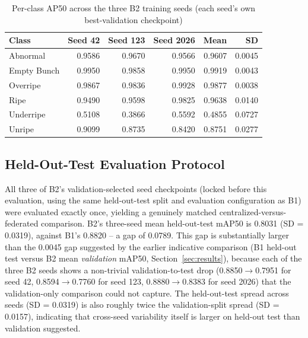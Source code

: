 \documentclass[11pt]{article}
\begin{document}
\begin{table}[H]
  \centering
  \caption{Per-class AP50 across the three B2 training seeds (each seed's own best-validation checkpoint)}
  \label{tab:per-class-stability}
  \begin{tabular}{lrrrrr}
    \toprule
    Class & Seed 42 & Seed 123 & Seed 2026 & Mean & SD \\
    \midrule
    Abnormal    & 0.9586 & 0.9670 & 0.9566 & 0.9607 & 0.0045 \\
    Empty Bunch & 0.9950 & 0.9858 & 0.9950 & 0.9919 & 0.0043 \\
    Overripe    & 0.9867 & 0.9836 & 0.9928 & 0.9877 & 0.0038 \\
    Ripe        & 0.9490 & 0.9598 & 0.9825 & 0.9638 & 0.0140 \\
    Underripe   & 0.5108 & 0.3866 & 0.5592 & 0.4855 & 0.0727 \\
    Unripe      & 0.9099 & 0.8735 & 0.8420 & 0.8751 & 0.0277 \\
    \bottomrule
  \end{tabular}
\end{table}

\subsection{Held-Out-Test Evaluation Protocol}
All three of B2's validation-selected seed checkpoints (locked before this evaluation, using the same held-out-test split and evaluation configuration as B1) were evaluated exactly once, yielding a genuinely matched centralized-versus-federated comparison. B2's three-seed mean held-out-test mAP50 is 0.8031 (SD = 0.0319), against B1's 0.8820 -- a gap of 0.0789. This gap is substantially larger than the 0.0045 gap suggested by the earlier indicative comparison (B1 held-out test versus B2 mean \emph{validation} mAP50, Section~\ref{sec:results}), because each of the three B2 seeds shows a non-trivial validation-to-test drop (0.8850$\to$0.7951 for seed 42, 0.8594$\to$0.7760 for seed 123, 0.8880$\to$0.8383 for seed 2026) that the validation-only comparison could not capture. The held-out-test spread across seeds (SD = 0.0319) is also roughly twice the validation-split spread (SD = 0.0157), indicating that cross-seed variability itself is larger on held-out test than validation suggested.
\end{document}
